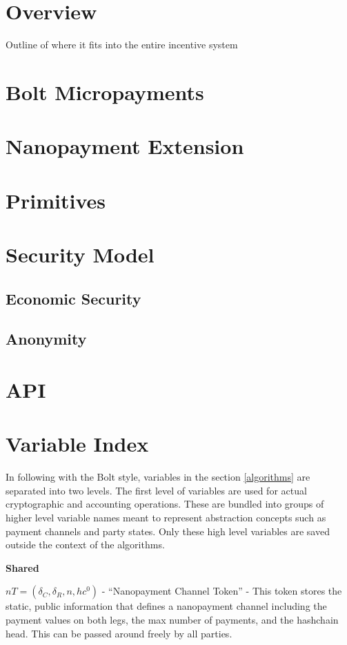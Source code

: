 \documentclass{article}
\begin{document}
\section{Overview}
Outline of where it fits into the entire incentive system
\section{Bolt Micropayments}

\section{Nanopayment Extension}

\section{Primitives}

\section{Security Model}

\subsection{Economic Security}

\subsection{Anonymity}

\section{API}

\section{Variable Index} \label{variable index}

In following with the Bolt style, variables in the section
\ref{algorithms} are separated into two levels. The first level of
variables are used for actual cryptographic and accounting
operations. These are bundled into groups of higher level variable
names meant to represent abstraction concepts such as payment channels
and party states. Only these high level variables are saved outside
the context of the algorithms.

\textbf{Shared}

$nT = (\delta_C, \delta_R, n, hc^0)$ - ``Nanopayment Channel Token'' -
This token stores the static, public information that defines a
nanopayment channel including the payment values on both legs, the max
number of payments, and the hashchain head. This can be passed around
freely by all parties.
\end{document}
